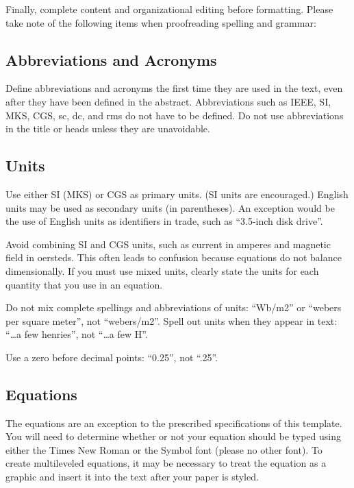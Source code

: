 \documentclass[conference,pbalance]{iaria}
\begin{document}
Finally, complete content and organizational editing before formatting. Please take note of the following items when proofreading spelling and grammar:

\subsection{Abbreviations and Acronyms}
Define abbreviations and acronyms the first time they are used in the text, even after they have been defined in the abstract. Abbreviations such as IEEE, SI, MKS, CGS, sc, dc, and rms do not have to be defined. Do not use abbreviations in the title or heads unless they are unavoidable.

\subsection{Units}
\begin{compactitem}
\item Use either SI (MKS) or CGS as primary units. (SI units are encouraged.) English units may be used as secondary units (in parentheses). An exception would be the use of English units as identifiers in trade, such as “3.5-inch disk drive”.
\item Avoid combining SI and CGS units, such as current in amperes and magnetic field in oersteds. This often leads to confusion because equations do not balance dimensionally. If you must use mixed units, clearly state the units for each quantity that you use in an equation.
\item Do not mix complete spellings and abbreviations of units: “Wb/m2” or “webers per square meter”, not “webers/m2”.  Spell out units when they appear in text: “\ldots a few henries”, not “\ldots a few H”.
\item Use a zero before decimal points: “0.25”, not “.25”.
\end{compactitem}

\subsection{Equations}

The equations are an exception to the prescribed specifications of this template. You will need to determine whether or not your equation should be typed using either the Times New Roman or the Symbol font (please no other font). To create multileveled equations, it may be necessary to treat the equation as a graphic and insert it into the text after your paper is styled.
\end{document}
